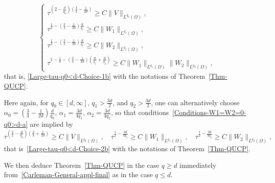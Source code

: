 \documentclass[10pt]{amsart}
\theoremstyle{definition}\newtheorem{defi}[theo]{Definition}\newtheorem{rema}[theo]{Remark}\newtheorem{exam}[theo]{Example}\newtheorem{exem}[theo]{Example}\newtheorem{nota}[theo]{Notation}
\newcommand*\ds{\displaystyle}
\renewcommand{\leq}{\leqslant}
\renewcommand{\geq}{\geqslant}
\begin{document}
\begin{equation}\label{Large-tau-q0>d-Choice-1}
\left\{
\begin{array}{l}
\ds \tau^{\left(2 - \frac{d}{q_0}\right) \left(\frac{3}{4}-\frac{1}{2d}\right)} \geq C \|V \|_{L^{q_0}(\Omega)},
\\[0.15em]
\ds
\tau^{\frac{1}{2} - \left(\frac{3}{4} - \frac{1}{2d}\right)\frac{d}{q_1}} \geq C \| W_{1} \|_{L^{q_1}(\Omega)},
\\
\tau^{\frac{1}{2} - \left(\frac{3}{4} - \frac{1}{2d}\right)\frac{d}{q_2}} \geq C \| W_{2} \|_{L^{q_2}(\Omega)},
\\[0.15em]
\ds \tau^{1-\frac{1}{d} - \left(\frac{3}{4} - \frac{1}{2d}\right)\left(\frac{d}{q_1} + \frac{d}{q_2}\right)} \geq C \| W_{1} \|_{L^{q_1}(\Omega)} \| W_{2} \|_{L^{q_2}(\Omega)},
\end{array}\right.
\end{equation}
that is, \eqref{Large-tau-q0<d-Choice-1b} with the notations of Theorem~\ref{Thm-QUCP}.

Here again, for $q_0 \in [d,\infty]$, $q_1 > \frac{3d}{2} $, and $q_2 > \frac{3d}{2} $, one can alternatively choose $\alpha_0 = (\frac{3}{4} - \frac{1}{2d})\frac{d}{q_0}$, $\alpha_1 = \frac{3d}{4q_1}$, $\alpha_2 = \frac{3d}{4q_2}$, so that conditions~\eqref{Conditions-W1=W2=0-q0>d-a} are implied by
\begin{equation*}
\tau^{\left(\frac{3}{2} - \frac{d}{q_0}\right) \left(\frac{3}{4}+\frac{1}{2d}\right)} \geq C \|V \|_{L^{q_0}(\Omega)},
\quad \tau^{\frac{1}{2} - \frac{3d}{4q_1}} \geq C \| W_{1} \|_{L^{q_1}(\Omega)},
\quad
\tau^{\frac{1}{2} - \frac{3d}{4q_2}} \geq C \| W_{2} \|_{L^{q_2}(\Omega)},\label{Large-tau-q0>d-Choice-2}
\end{equation*}
that is~\eqref{Large-tau-q0<d-Choice-2b} with the notations of Theorem~\ref{Thm-QUCP}.

We then deduce Theorem~\ref{Thm-QUCP} in the case $q\geq d$ immediately from~\eqref{Carleman-General-appl-final} as in the case $q \leq d$.
\end{document}
